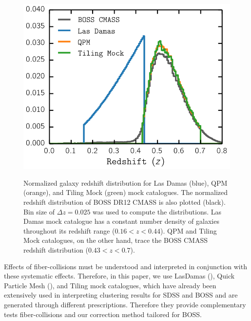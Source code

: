 \documentclass{emulateapj}
\begin{document}
\def \cmasscolor{black}
\def \ldgcolor{blue}
\def \qpmcolor{orange}
\def \tmcolor{green}
\begin{figure}
\begin{center}
\includegraphics[scale=0.45]{fcpaper_z_dist.png} \label{fig:zdist}
\caption{Normalized galaxy redshift distribution for Las Damas (\ldgcolor), QPM (\qpmcolor), and Tiling Mock (\tmcolor) mock catalogues. The normalized redshift distribution of BOSS DR12 CMASS is also plotted (\cmasscolor). Bin size of $\Delta z = 0.025$ was used to compute the distributions. Las Damas mock catalogue has a constant number density of galaxies throughout its redshift range ($0.16 < z < 0.44$). QPM and Tiling Mock catalogues, on the other hand, trace the BOSS CMASS redshift distribution ($0.43 < z < 0.7$).}
\end{center}
\end{figure}

Effects of fiber-collisions must be understood and interpreted in conjunction with these systematic effects. Therefore, in this paper, we use LasDamas (\citealt{McBride:2009aa, McBride:2011aa}), Quick Particle Mesh (\citealt{White:2014aa}), and Tiling mock catalogues, which have already been extensively used in interpreting clustering results for SDSS and BOSS and are generated through different prescriptions. Therefore they provide complementary tests fiber-collisions and our correction method tailored for BOSS. 
\end{document}
